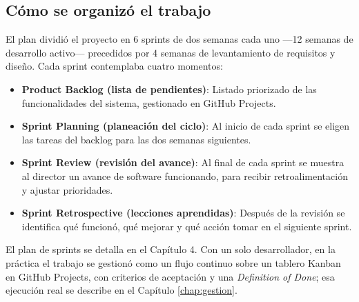 \subsection{Cómo se organizó el trabajo}

El plan dividió el proyecto en 6 sprints de dos semanas cada uno —12 semanas de desarrollo activo— precedidos por 4 semanas de levantamiento de requisitos y diseño. Cada sprint contemplaba cuatro momentos:

\begin{itemize}
    \item \textbf{Product Backlog (lista de pendientes)}: Listado priorizado de las funcionalidades del sistema, gestionado en GitHub Projects.
    \item \textbf{Sprint Planning (planeación del ciclo)}: Al inicio de cada sprint se eligen las tareas del backlog para las dos semanas siguientes.
    \item \textbf{Sprint Review (revisión del avance)}: Al final de cada sprint se muestra al director un avance de software funcionando, para recibir retroalimentación y ajustar prioridades.
    \item \textbf{Sprint Retrospective (lecciones aprendidas)}: Después de la revisión se identifica qué funcionó, qué mejorar y qué acción tomar en el siguiente sprint.
\end{itemize}

El plan de sprints se detalla en el Capítulo 4. Con un solo desarrollador, en la práctica el trabajo se gestionó como un flujo continuo sobre un tablero Kanban en GitHub Projects, con criterios de aceptación y una \textit{Definition of Done}; esa ejecución real se describe en el Capítulo \ref{chap:gestion}.

\newpage
